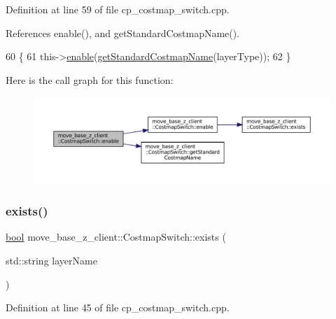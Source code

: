 Definition at line 59 of file cp\+\_\+costmap\+\_\+switch.\+cpp.



References enable(), and get\+Standard\+Costmap\+Name().


\begin{DoxyCode}
60 \{
61     this->\hyperlink{classmove__base__z__client_1_1CostmapSwitch_ab605fa05a9e899c58f8502990e91586a}{enable}(\hyperlink{classmove__base__z__client_1_1CostmapSwitch_ae8635d58b81be774e18eb4afa99413e1}{getStandardCostmapName}(layerType));
62 \}
\end{DoxyCode}
Here is the call graph for this function\+:
\nopagebreak
\begin{figure}[H]
\begin{center}
\leavevmode
\includegraphics[width=350pt]{classmove__base__z__client_1_1CostmapSwitch_a4f67bece32c5a66222bda0144d8f74d5_cgraph}
\end{center}
\end{figure}
\mbox{\label{classmove__base__z__client_1_1CostmapSwitch_a3898ad9aa2ecf59d29a99e152f21a0d4}} 
\subsubsection{\texorpdfstring{exists()}{exists()}}
{\footnotesize\ttfamily \hyperlink{classbool}{bool} move\+\_\+base\+\_\+z\+\_\+client\+::\+Costmap\+Switch\+::exists (\begin{DoxyParamCaption}\item[{std\+::string}]{layer\+Name }\end{DoxyParamCaption})}



Definition at line 45 of file cp\+\_\+costmap\+\_\+switch.\+cpp.



